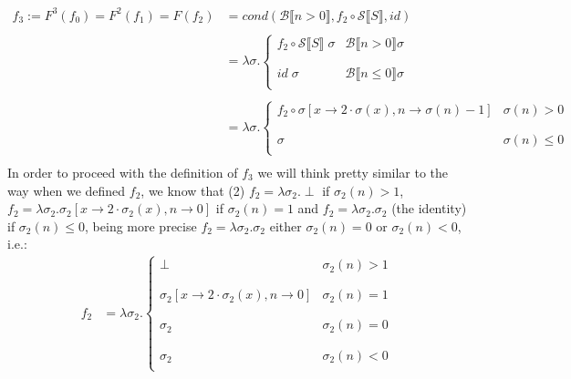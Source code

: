 \documentclass{article}
\newcommand{\bcal}{\mathcal{B}}
\newcommand{\scal}{\mathcal{S}}
\newcommand{\bool}[1]{\bcal \llbracket #1 \rrbracket}
\newcommand{\sem}[1]{\scal \llbracket #1 \rrbracket}
\begin{document}
\begin{align*}
f_3 := F^3(f_0) = F^2(f_1) = F(f_2) &= cond(\bool{n > 0}, f_2 \circ \sem{S},id) \\ \\
& = \lambda \sigma . \left\{
\begin{array}{ll}
      f_2 \circ \sem{S} \; \sigma & \bool{n>0} \sigma\\
      \\ \\
      id \; \sigma & \bool{n \leq 0} \sigma \\
\end{array} 
\right. \\ \\
& = \lambda \sigma . \left\{
\begin{array}{ll}
      f_2 \circ \sigma[x\rightarrow 2 \cdot \sigma(x), n \rightarrow \sigma(n)-1] & \sigma(n) > 0 \\
      \\ \\
      \sigma & \sigma(n) \leq 0 \\
\end{array} 
\right.\\
\end{align*}
In  order to proceed with the definition of $f_3$ we will think pretty similar to the way when we defined $f_2$, we know that (2) $f_2 = \lambda \sigma_2 . \perp$ if $\sigma_2(n) > 1$, $f_2 = \lambda \sigma_2 . \sigma_2[x\rightarrow 2 \cdot \sigma_2(x), n \rightarrow 0]$ if $\sigma_2(n)=1$ and $f_2 = \lambda \sigma_2 . \sigma_2$ (the identity) if $\sigma_2(n) \leq 0$, being more precise $f_2 = \lambda \sigma_2 . \sigma_2$ either $\sigma_2(n) = 0$ or $\sigma_2(n) < 0$, i.e.:
\begin{align*}
f_2 &= \lambda \sigma_2 . \left\{
\begin{array}{ll}
      \perp & \sigma_2(n) > 1 \\
      \\ \\
      \sigma_2[x\rightarrow 2 \cdot \sigma_2(x), n \rightarrow 0] & \sigma_2(n) = 1 \\
      \\ \\
      \sigma_2 & \sigma_2(n) = 0 \\
      \\ \\
      \sigma_2 & \sigma_2(n) < 0 \\
\end{array} 
\right.
\end{align*}
\end{document}
